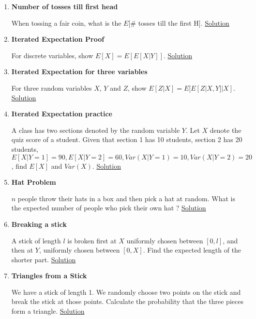 \documentclass[11pt, a4paper]{article}
\begin{document}
\begin{enumerate}
    \item \hypertarget{q_tossh}{\textbf{Number of tosses till first head}}\newline
    When tossing a fair coin, what is the $E[$\# tosses till the first H$]$. \hyperlink{a_tossh}{Solution}
    
    \item \hypertarget{q_itrexpproof}{\textbf{Iterated Expectation Proof}}\newline
    For discrete variables, show $E[X] = E[E[X|Y]]$. \hyperlink{a_itrexpproof}{Solution}
    
    \item \hypertarget{q_itrexpthree}{\textbf{Iterated Expectation for three variables}}\newline
    For three random variables $X$, $Y$ and $Z$, show $E[Z|X] = E[E[Z|X,Y]|X]$. \hyperlink{a_itrexpthree}{Solution}
    
    \item \hypertarget{q_itrexppractice}{\textbf{Iterated Expectation practice}}\newline
    A class has two sections denoted by the random variable $Y$. Let $X$ denote the quiz score of a student. Given that section 1 has 10 students, section 2 has 20 students, $E[X|Y=1] = 90, E[X|Y=2] = 60, Var(X|Y=1) = 10, Var(X|Y=2) = 20$, find $E[X]$ and $Var(X)$. \hyperlink{a_itrexppractice}{Solution}

    \item \hypertarget{q_hatproblem}{\textbf{Hat Problem}}\newline
    $n$ people throw their hats in a box and then pick a hat at random. What is the expected number of people who pick their own hat ? \hyperlink{a_hatproblem}{Solution}
    
    \item \hypertarget{q_breakstick}{\textbf{Breaking a stick}}\newline
    A stick of length $l$ is broken first at $X$ uniformly chosen between $[0,l]$, and then at $Y$, uniformly chosen between $[0,X]$. Find the expected length of the shorter part. \hyperlink{a_breakstick}{Solution}

    
    \item \hypertarget{q_trianglestick}{\textbf{Triangles from a Stick}}\newline
    We have a stick of length 1. We randomly choose two points on the stick and break the stick at those points. Calculate the probability that the three pieces form a triangle. \hyperlink{a_trianglestick}{Solution}



\end{enumerate}
\end{document}
